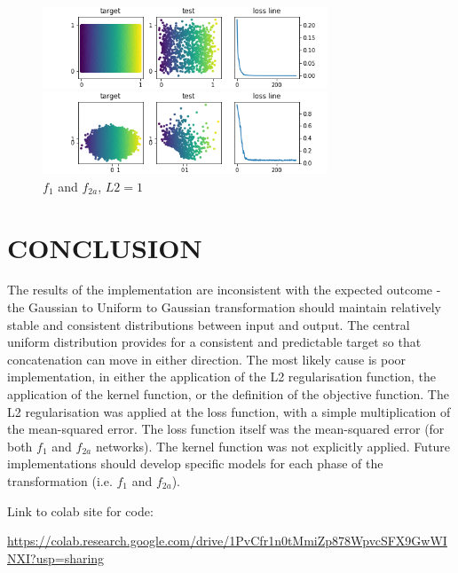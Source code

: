 \documentclass{article}
\begin{document}
\begin{figure}[htb]
\begin{minipage}[b]{1\linewidth}
  \centering
  \centerline{\includegraphics[width=8.5cm]{f1_1_300_1000}}
\end{minipage}
%
\begin{minipage}[b]{1\linewidth}
  \centering
  \centerline{\includegraphics[width=8.5cm]{f2a_1_300_1000}}
\end{minipage}
%
\caption{$f_1$ and $f_{2a}$, $L2 = 1$}
\label{fig:res2}

\end{figure}

\hfill



\section{CONCLUSION}
\label{sec:CONC}

The results of the implementation are inconsistent with the expected outcome - the Gaussian to Uniform to Gaussian transformation should maintain relatively stable and consistent distributions between input and output.  The central uniform distribution provides for a consistent and predictable target so that concatenation can move in either direction.  The most likely cause is poor implementation, in either the application of the L2 regularisation function, the application of the kernel function, or the definition of the objective function.  
The L2 regularisation was applied at the loss function, with a simple multiplication of the mean-squared error.  The loss function itself was the mean-squared error (for both $f_1$ and $f_{2a}$ networks).  The kernel function was not explicitly applied.  Future implementations should develop specific models for each phase of the transformation (i.e. $f_1$ and $f_{2a}$).

Link to colab site for code: 

\url{https://colab.research.google.com/drive/1PvCfr1n0tMmiZp878WpvcSFX9GwWINXI?usp=sharing}



\end{document}
